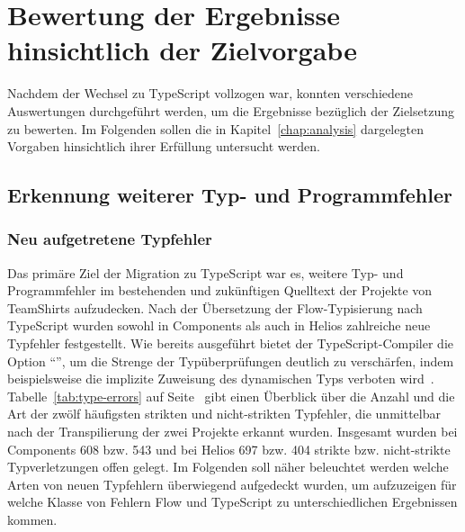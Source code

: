 \section{Bewertung der Ergebnisse hinsichtlich der Zielvorgabe}

Nachdem der Wechsel zu TypeScript vollzogen war, konnten verschiedene Auswertungen durchgeführt werden, um die Ergebnisse bezüglich der Zielsetzung zu bewerten. Im Folgenden sollen die in Kapitel~\ref{chap:analysis} dargelegten Vorgaben hinsichtlich ihrer Erfüllung untersucht werden.

\subsection{Erkennung weiterer Typ- und Programmfehler}
\label{goal:new-type-errors}

\subsubsection{Neu aufgetretene Typfehler}

Das primäre Ziel der Migration zu TypeScript war es, weitere Typ- und Programmfehler im bestehenden und zukünftigen Quelltext der Projekte von TeamShirts aufzudecken. Nach der Übersetzung der Flow-Typisierung nach TypeScript wurden sowohl in Components als auch in Helios zahlreiche neue Typfehler festgestellt. Wie bereits ausgeführt bietet der TypeScript-Compiler die Option \enquote{}, um die Strenge der Typüberprüfungen deutlich zu verschärfen, indem beispielsweise die implizite Zuweisung des dynamischen Typs  verboten wird~\autocite{TSC:OPTIONS}. Tabelle~\ref{tab:type-errors} auf Seite~\pageref{tab:type-errors} gibt einen Überblick über die Anzahl und die Art der zwölf häufigsten strikten und nicht-strikten Typfehler, die unmittelbar nach der Transpilierung der zwei Projekte erkannt wurden. Insgesamt wurden bei Components 608 bzw. 543 und bei Helios 697 bzw. 404 strikte bzw. nicht-strikte Typverletzungen offen gelegt. Im Folgenden soll näher beleuchtet werden welche Arten von neuen Typfehlern überwiegend aufgedeckt wurden, um aufzuzeigen für welche Klasse von Fehlern Flow und TypeScript zu unterschiedlichen Ergebnissen kommen.



